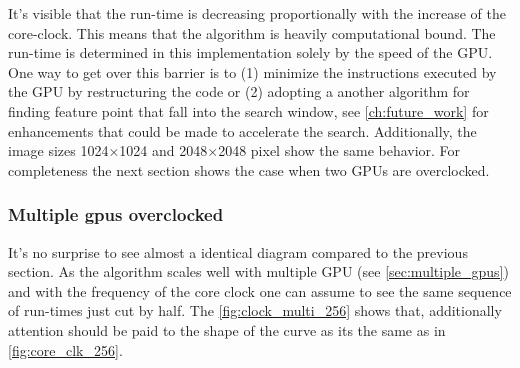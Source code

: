 It's visible that the run-time is decreasing proportionally with the increase of
the core-clock. This means that the algorithm is heavily computational bound.
The run-time is determined in this implementation solely by the speed of the
\gls{GPU}. One way to get over this barrier is to (1) minimize the instructions
executed by the \gls{GPU} by restructuring the code or (2) adopting a another
algorithm for finding feature point that fall into the search window, see
\autoref{ch:future_work} for enhancements that could be made to accelerate the
search. Additionally, the image sizes 1024$\times$1024 and 2048$\times$2048
pixel show the same behavior.
For completeness the next section shows the case when two \glspl{GPU} are 
overclocked.

\subsubsection{Multiple gpus overclocked} %
\label{ssub:multiple_gpus_overclocked}
It's no surprise to see almost a identical diagram compared to the previous
section. As the algorithm scales well with multiple \gls{GPU} (see
\autoref{sec:multiple_gpus}) and with the frequency of the core clock one can 
assume to see the same sequence of run-times just cut by half. The
\autoref{fig:clock_multi_256} shows that, additionally attention should be paid
to the shape of the curve as its the same as in \autoref{fig:core_clk_256}. 

